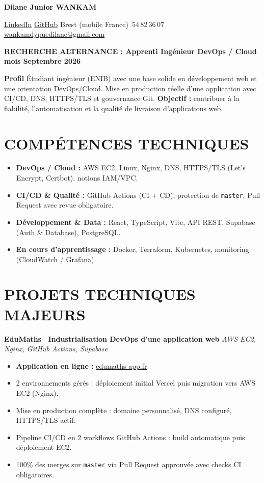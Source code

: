 \documentclass[10pt,a4paper]{article}
\newcommand{\cvheading}[1]{
  \vspace{0.2em}
  {\centering\colorbox{mainblue}{\parbox{0.97\linewidth}{\centering\color{white}\bfseries #1}}\par}
  \vspace{0.2em}
}
\begin{document}
{\centering
  {\LARGE\bfseries Dilane Junior WANKAM}\par
  \vspace{0.3em}
  \small
  \href{https://www.linkedin.com/in/dilane-wankam}{LinkedIn}
  \;\textbullet\;
  \href{https://github.com/wankamdypuedilane}{GitHub}
  \;\textbullet\;
  Brest (mobile France)
  \;\textbullet{}\,54\,82\,36\,07
  \;\textbullet\;
  \href{mailto:wankamdypuedilane@gmail.com}{wankamdypuedilane@gmail.com}
  \par
}

\cvheading{RECHERCHE ALTERNANCE : Apprenti Ingénieur DevOps / Cloud \quad \textbullet \quad 12 mois \quad \textbullet \quad Septembre 2026}

\textbf{Profil} Étudiant ingénieur (ENIB) avec une base solide en développement web et une orientation DevOps/Cloud.
Mise en production réelle d'une application avec CI/CD, DNS, HTTPS/TLS et gouvernance Git.
\textbf{Objectif :} contribuer à la fiabilité, l'automatisation et la qualité de livraison d'applications web.

\section{COMPÉTENCES TECHNIQUES}
\begin{itemize}
  \item \textbf{DevOps / Cloud :} AWS EC2, Linux, Nginx, DNS, HTTPS/TLS (Let's Encrypt, Certbot), notions IAM/VPC.
  \item \textbf{CI/CD \& Qualité :} GitHub Actions (CI + CD), protection de \texttt{master}, Pull Request avec revue obligatoire.
  \item \textbf{Développement \& Data :} React, TypeScript, Vite, API REST, Supabase (Auth \& Database), PostgreSQL.
  \item \textbf{En cours d'apprentissage :} Docker, Terraform, Kubernetes, monitoring (CloudWatch / Grafana).
\end{itemize}

\section{PROJETS TECHNIQUES MAJEURS}

\textbf{EduMaths \textbar\ Industrialisation DevOps d'une application web} \hfill \textit{AWS EC2, Nginx, GitHub Actions, Supabase}
\begin{itemize}
  \item \textbf{Application en ligne :} \href{https://edumaths-app.fr}{edumaths-app.fr}
  \item 2 environnements gérés : déploiement initial Vercel puis migration vers AWS EC2 (Nginx).
  \item Mise en production complète : domaine personnalisé, DNS configuré, HTTPS/TLS actif.
  \item Pipeline CI/CD en 2 workflows GitHub Actions : build automatique puis déploiement EC2.
  \item 100\% des merges sur \texttt{master} via Pull Request approuvée avec checks CI obligatoires.
\end{itemize}
\end{document}
